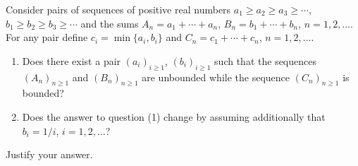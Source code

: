 Consider pairs of sequences of positive real numbers $a_1 \geq a_2 \geq a_3 \geq \cdots$, $b_1 \geq b_2 \geq b_3 \geq \cdots$ and the sums $A_n = a_1 + \cdots + a_n$, $B_n = b_1 + \cdots + b_n$, $n = 1, 2, \ldots$. For any pair define $c_i = \min\{a_i, b_i\}$ and $C_n = c_1 + \cdots + c_n$, $n = 1, 2, \ldots$.
\begin{enumerate}
\item[(a)] Does there exist a pair $(a_i)_{i \geq 1}$, $(b_i)_{i \geq 1}$ such that the sequences $(A_n)_{n \geq 1}$ and $(B_n)_{n \geq 1}$ are unbounded while the sequence $(C_n)_{n \geq 1}$ is bounded?
\item[(b)] Does the answer to question (1) change by assuming additionally that $b_i = 1/i$, $i = 1, 2, \ldots$?
\end{enumerate}
Justify your answer.
